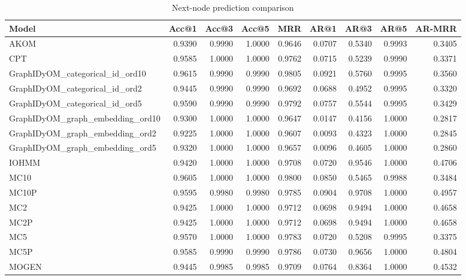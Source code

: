 \begin{table}
\caption{Next-node prediction comparison}
\label{tab:comparison}
\begin{tabular}{lrrrrrrrr}
\toprule
Model & Acc@1 & Acc@3 & Acc@5 & MRR & AR@1 & AR@3 & AR@5 & AR-MRR \\
\midrule
AKOM & 0.9390 & 0.9990 & 1.0000 & 0.9646 & 0.0707 & 0.5340 & 0.9993 & 0.3405 \\
CPT & 0.9585 & 1.0000 & 1.0000 & 0.9762 & 0.0715 & 0.5239 & 0.9990 & 0.3371 \\
GraphIDyOM_categorical_id_ord10 & 0.9615 & 0.9990 & 0.9990 & 0.9805 & 0.0921 & 0.5760 & 0.9995 & 0.3560 \\
GraphIDyOM_categorical_id_ord2 & 0.9445 & 0.9990 & 0.9990 & 0.9692 & 0.0688 & 0.4952 & 0.9995 & 0.3320 \\
GraphIDyOM_categorical_id_ord5 & 0.9590 & 0.9990 & 0.9990 & 0.9792 & 0.0757 & 0.5544 & 0.9995 & 0.3429 \\
GraphIDyOM_graph_embedding_ord10 & 0.9300 & 1.0000 & 1.0000 & 0.9647 & 0.0147 & 0.4156 & 1.0000 & 0.2817 \\
GraphIDyOM_graph_embedding_ord2 & 0.9225 & 1.0000 & 1.0000 & 0.9607 & 0.0093 & 0.4323 & 1.0000 & 0.2845 \\
GraphIDyOM_graph_embedding_ord5 & 0.9320 & 1.0000 & 1.0000 & 0.9657 & 0.0096 & 0.4605 & 1.0000 & 0.2860 \\
IOHMM & 0.9420 & 1.0000 & 1.0000 & 0.9708 & 0.0720 & 0.9546 & 1.0000 & 0.4706 \\
MC10 & 0.9605 & 1.0000 & 1.0000 & 0.9800 & 0.0850 & 0.5465 & 0.9988 & 0.3484 \\
MC10P & 0.9595 & 0.9980 & 0.9980 & 0.9785 & 0.0904 & 0.9708 & 1.0000 & 0.4957 \\
MC2 & 0.9425 & 1.0000 & 1.0000 & 0.9712 & 0.0698 & 0.9494 & 1.0000 & 0.4658 \\
MC2P & 0.9425 & 1.0000 & 1.0000 & 0.9712 & 0.0698 & 0.9494 & 1.0000 & 0.4658 \\
MC5 & 0.9570 & 1.0000 & 1.0000 & 0.9783 & 0.0720 & 0.5208 & 0.9995 & 0.3375 \\
MC5P & 0.9585 & 0.9990 & 0.9990 & 0.9786 & 0.0730 & 0.9656 & 1.0000 & 0.4804 \\
MOGEN & 0.9445 & 0.9985 & 0.9985 & 0.9709 & 0.0764 & 0.8364 & 1.0000 & 0.4532 \\
\bottomrule
\end{tabular}
\end{table}
